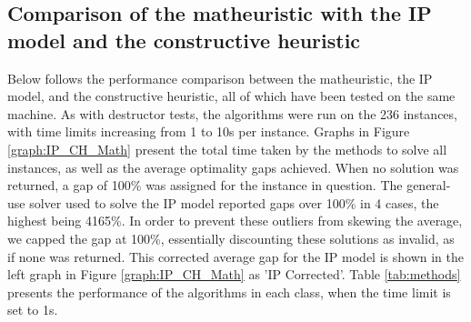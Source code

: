 \documentclass[preprint,12pt,3p]{elsarticle}
\begin{document}
\subsection{Comparison of the matheuristic with the IP model and the constructive heuristic}
Below follows the performance comparison between the matheuristic, the IP model, and the constructive heuristic, all of which have been tested on the same machine. As with destructor tests, the algorithms were run on the 236 instances, with time limits increasing from 1 to 10s per instance. Graphs in Figure \ref{graph:IP_CH_Math} present the total time taken by the methods to solve all instances, as well as the average optimality gaps achieved. When no solution was returned, a gap of 100\% was assigned for the instance in question. The general-use solver used to solve the IP model reported gaps over 100\% in 4 cases, the highest being 4165\%. In order to prevent these outliers from skewing the average, we capped the gap at 100\%, essentially discounting these solutions as invalid, as if none was returned. This corrected average gap for the IP model is shown in the left graph in Figure \ref{graph:IP_CH_Math} as 'IP Corrected'. Table \ref{tab:methods} presents the performance of the algorithms in each class, when the time limit is set to 1s.
\end{document}
